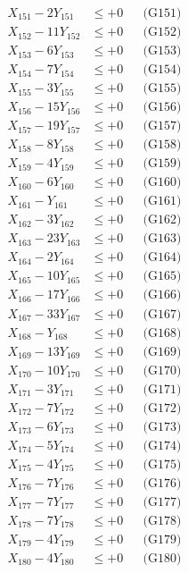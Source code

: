 \documentclass[a4paper,10pt]{article}
\begin{document}
{\begin{align}
X_{151} - 2Y_{151} &\leq +0 && \text{(G151)} \\
X_{152} - 11Y_{152} &\leq +0 && \text{(G152)} \\
X_{153} - 6Y_{153} &\leq +0 && \text{(G153)} \\
\allowbreak
X_{154} - 7Y_{154} &\leq +0 && \text{(G154)} \\
X_{155} - 3Y_{155} &\leq +0 && \text{(G155)} \\
X_{156} - 15Y_{156} &\leq +0 && \text{(G156)} \\
X_{157} - 19Y_{157} &\leq +0 && \text{(G157)} \\
X_{158} - 8Y_{158} &\leq +0 && \text{(G158)} \\
X_{159} - 4Y_{159} &\leq +0 && \text{(G159)} \\
X_{160} - 6Y_{160} &\leq +0 && \text{(G160)} \\
X_{161} - Y_{161} &\leq +0 && \text{(G161)} \\
X_{162} - 3Y_{162} &\leq +0 && \text{(G162)} \\
X_{163} - 23Y_{163} &\leq +0 && \text{(G163)} \\
\allowbreak
X_{164} - 2Y_{164} &\leq +0 && \text{(G164)} \\
X_{165} - 10Y_{165} &\leq +0 && \text{(G165)} \\
X_{166} - 17Y_{166} &\leq +0 && \text{(G166)} \\
X_{167} - 33Y_{167} &\leq +0 && \text{(G167)} \\
X_{168} - Y_{168} &\leq +0 && \text{(G168)} \\
X_{169} - 13Y_{169} &\leq +0 && \text{(G169)} \\
X_{170} - 10Y_{170} &\leq +0 && \text{(G170)} \\
X_{171} - 3Y_{171} &\leq +0 && \text{(G171)} \\
X_{172} - 7Y_{172} &\leq +0 && \text{(G172)} \\
X_{173} - 6Y_{173} &\leq +0 && \text{(G173)} \\
\allowbreak
X_{174} - 5Y_{174} &\leq +0 && \text{(G174)} \\
X_{175} - 4Y_{175} &\leq +0 && \text{(G175)} \\
X_{176} - 7Y_{176} &\leq +0 && \text{(G176)} \\
X_{177} - 7Y_{177} &\leq +0 && \text{(G177)} \\
X_{178} - 7Y_{178} &\leq +0 && \text{(G178)} \\
X_{179} - 4Y_{179} &\leq +0 && \text{(G179)} \\
X_{180} - 4Y_{180} &\leq +0 && \text{(G180)} \\

\end{align}}
\end{document}
